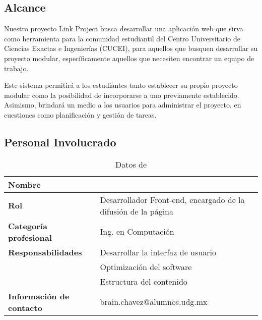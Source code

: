 	\subsection{Alcance}

	Nuestro proyecto Link Project busca desarrollar una aplicación web que sirva como
	herramienta para la comunidad estudiantil del Centro Universitario de Ciencias
	Exactas e Ingenierías (CUCEI), para aquellos que busquen desarrollar su
	proyecto modular, específicamente aquellos que necesiten encontrar un equipo de
	trabajo.

	Este sistema permitirá a los estudiantes tanto establecer su propio proyecto modular
	como la posibilidad de incorporarse a uno previamente establecido. Asimismo, brindará
	un medio a los usuarios para administrar el proyecto, en cuestiones como
	planificación y gestión de tareas.

	\subsection{Personal Involucrado}

	\begin{table}[h!]
		\centering
		\begin{tabular}{|l|p{10cm}|}
			\hline
			\textbf{Nombre}                  & \cAuthor                                                       \\
			\hline
			\textbf{Rol}                     & Desarrollador Front-end, encargado de la difusión de la página \\
			\hline
			\textbf{Categoría profesional}   & Ing. en Computación                                            \\
			\hline
			\textbf{Responsabilidades}       & Desarrollar la interfaz de usuario                             \\
			                                 & Optimización del software                                      \\
			                                 & Estructura del contenido                                       \\
			\hline
			\textbf{Información de contacto} & brain.chavez@alumnos.udg.mx                                    \\
			\hline
		\end{tabular}
		\caption{Datos de \cAuthor}
	\end{table}

